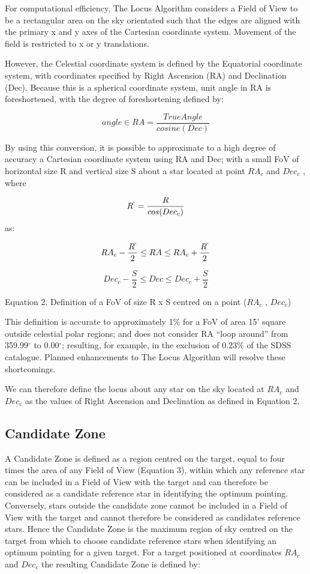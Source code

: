 \documentclass[]{elsarticle} %
\begin{document}
For computational efficiency, The Locus Algorithm considers a Field of
View to be a rectangular area on the sky orientated such that the edges
are aligned with the primary x and y axes of the Cartesian coordinate
system. Movement of the field is restricted to x or y translations.

However, the Celestial coordinate system is defined by the Equatorial
coordinate system, with coordinates specified by Right Ascension (RA)
and Declination (Dec). Because this is a spherical coordinate system,
unit angle in RA is foreshortened, with the degree of foreshortening
defined by:

\[angle \in RA = {\frac{True Angle}{cosine(Dec)}} \tag{Equation 1: Right Ascension foreshortening with Declination}\]

By using this conversion, it is possible to approximate to a high degree
of accuracy a Cartesian coordinate system using RA and Dec; with a small
FoV of horizontal size R and vertical size S about a star located at
point \(RA_c\) and \(Dec_c\) , where

\[R^` = {\frac{R}{cos(Dec_c)}}\] as:

\[RA_c - {\frac{R^`}{2}} \leq RA \leq RA_c + {\frac{R^`}{2}} \]

\[Dec_c - {\frac{S}{2}} \leq Dec \leq Dec_c + {\frac{S}{2}}\]

Equation 2. Definition of a FoV of size R x S centred on a point
(\(RA_c\) , \(Dec_c\))

This definition is accurate to approximately 1\% for a FoV of area 15'
square outside celestial polar regions; and does not consider RA ``loop
around'' from 359.99\(^{\circ}\) to 0.00\(^{\circ}\); resulting, for
example, in the exclusion of 0.23\% of the SDSS catalogue. Planned
enhancements to The Locus Algorithm will resolve these shortcomings.

We can therefore define the locus about any star on the sky located at
\(RA_c\) and \(Dec_c\) as the values of Right Ascension and Declination
as defined in Equation 2.

\hypertarget{candidate-zone}{%
\subsection{Candidate Zone}\label{candidate-zone}}

A Candidate Zone is defined as a region centred on the target, equal to
four times the area of any Field of View (Equation 3), within which any
reference star can be included in a Field of View with the target and
can therefore be considered as a candidate reference star in identifying
the optimum pointing. Conversely, stars outside the candidate zone
cannot be included in a Field of View with the target and cannot
therefore be considered as candidates reference stars. Hence the
Candidate Zone is the maximum region of sky centred on the target from
which to choose candidate reference stars when identifying an optimum
pointing for a given target. For a target positioned at coordinates
\(RA_c\) and \(Dec_c\) the resulting Candidate Zone is defined by:
\end{document}
